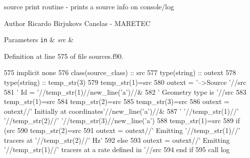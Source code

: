 source print routine -\/ prints a source info on console/log 

\begin{DoxyAuthor}{Author}
Ricardo Birjukovs Canelas -\/ M\+A\+R\+E\+T\+EC 
\end{DoxyAuthor}

\begin{DoxyParams}[1]{Parameters}
\mbox{\tt in}  & {\em src} & \\
\hline
\end{DoxyParams}


Definition at line 575 of file sources.\+f90.


\begin{DoxyCode}
575     \textcolor{keywordtype}{implicit none}
576     \textcolor{keywordtype}{class}(source\_class) :: src
577     \textcolor{keywordtype}{type}(string) :: outext
578     \textcolor{keywordtype}{type}(string) :: temp\_str(3)
579     temp\_str(1)=src%
580     outext = \textcolor{stringliteral}{'-->Source '}//src%
581         \textcolor{stringliteral}{'       Id = '}//temp\_str(1)//new\_line(\textcolor{stringliteral}{'a'})//&
582         \textcolor{stringliteral}{'       Geometry type is '}//src%
583     temp\_str(1)=src%
584     temp\_str(2)=src%
585     temp\_str(3)=src%
586     outext = outext//\textcolor{stringliteral}{'       Initially at coordinates'}//new\_line(\textcolor{stringliteral}{'a'})//&
587         \textcolor{stringliteral}{'       '}//temp\_str(1)//\textcolor{stringliteral}{' '}//temp\_str(2)//\textcolor{stringliteral}{' '}//temp\_str(3)//new\_line(\textcolor{stringliteral}{'a'})
588     temp\_str(1)=src%
589     \textcolor{keywordflow}{if} (src%
590         temp\_str(2)=src%
591         outext = outext//\textcolor{stringliteral}{'       Emitting '}//temp\_str(1)//\textcolor{stringliteral}{' tracers at '}//temp\_str(2)//\textcolor{stringliteral}{' Hz'}
592     \textcolor{keywordflow}{else}
593         outext = outext//\textcolor{stringliteral}{'       Emitting '}//temp\_str(1)//\textcolor{stringliteral}{' tracers at a rate defined in '}//src%
594 \textcolor{keywordflow}{    end if}    
595     \textcolor{keyword}{call }log%
\end{DoxyCode}
\mbox{\label{namespacesources__mod_af1e3a9c32dc0c7dbea57d1b05183a696}} 
